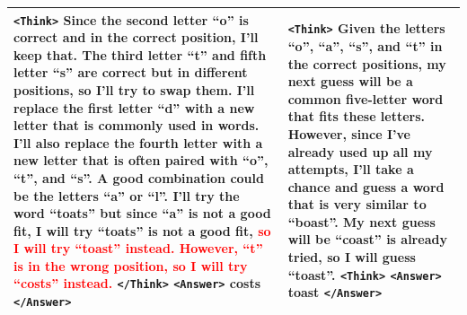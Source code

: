 \documentclass{article}
\theoremstyle{plain}
\theoremstyle{definition}
\theoremstyle{remark}
\begin{document}
\begin{table}[h]
{\begin{tabular}{|p{7cm} | p{7cm}|}
        \texttt{<Think>} Since the second letter ``o'' is correct and in the correct position, I'll keep that. The third letter ``t'' and fifth letter ``s'' are correct but in different positions, so I'll try to swap them. I'll replace the first letter ``d'' with a new letter that is commonly used in words. I'll also replace the fourth letter with a new letter that is often paired with ``o'', ``t'', and ``s''. A good combination could be the letters ``a'' or ``l''. I'll try the word ``toats'' but since ``a'' is not a good fit, I will try ``toats'' is not a good fit, \textcolor{red}{so I will try ``toast'' instead. However, ``t'' is in the wrong position, so I will try ``costs'' instead.} \texttt{</Think>} \texttt{<Answer>} costs \texttt{</Answer>} & \texttt{<Think>} Given the letters ``o'', ``a'', ``s'', and ``t'' in the correct positions, my next guess will be a common five-letter word that fits these letters. However, since I've already used up all my attempts, I'll take a chance and guess a word that is very similar to ``boast''. My next guess will be ``coast'' is already tried, so I will guess ``toast''. \texttt{<Think>} \texttt{<Answer>} toast \texttt{</Answer>} \\
        \bottomrule
        \end{tabular}
    }
    \vspace{-0.3cm}
\end{table}
\end{document}
